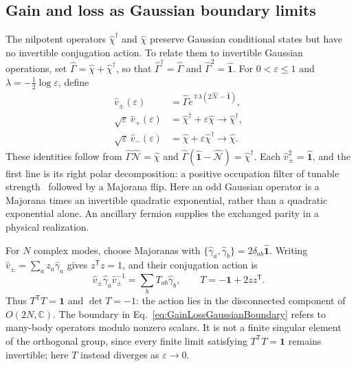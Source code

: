 \documentclass[aps,prb,10pt,twocolumn,superscriptaddress,longbibliography,floatfix]{revtex4-2}
\newcommand{\mc}[1]{\mathcal{#1}}
\begin{document}
{\color{blue}
\subsection{Gain and loss as Gaussian boundary limits}
\label{app:GaussianBoundary}

The nilpotent operators $\hat\chi^\dagger$ and $\hat\chi$ preserve Gaussian conditional states but have no invertible conjugation action. To relate them to invertible Gaussian operations, set $\hat\Gamma=\hat\chi+\hat\chi^\dagger$, so that $\hat\Gamma^\dagger=\hat\Gamma$ and $\hat\Gamma^2=\hat{\mathbf{1}}$. For $0<\varepsilon\leq1$ and $\lambda=-\tfrac12\log\varepsilon$, define
\begin{align}
 \hat v_\pm(\varepsilon)
 &=\hat\Gamma e^{\mp\lambda(2\hat{\mc N}-\hat{\mathbf{1}})},\nonumber\\
 \sqrt\varepsilon\,\hat v_+(\varepsilon)
 &=\hat\chi^\dagger+\varepsilon\hat\chi\longrightarrow\hat\chi^\dagger,\nonumber\\
 \sqrt\varepsilon\,\hat v_-(\varepsilon)
 &=\hat\chi+\varepsilon\hat\chi^\dagger\longrightarrow\hat\chi.
 \label{eq:GainLossGaussianBoundary}
\end{align}
These identities follow from $\hat\Gamma\hat{\mc N}=\hat\chi$ and $\hat\Gamma(\hat{\mathbf{1}}-\hat{\mc N})=\hat\chi^\dagger$. Each $\hat v_\pm^2=\hat{\mathbf{1}}$, and the first line is its right polar decomposition: a positive occupation filter of tunable strength~\cite{BhuiyanPanJian2026} followed by a Majorana flip. Here an odd Gaussian operator is a Majorana times an invertible quadratic exponential, rather than a quadratic exponential alone. An ancillary fermion supplies the exchanged parity in a physical realization.

For $N$ complex modes, choose Majoranas with $\{\hat\gamma_a,\hat\gamma_b\}=2\delta_{ab}\hat{\mathbf{1}}$. Writing $\hat v_\pm=\sum_a z_a\hat\gamma_a$ gives $z^{\mathsf T}z=1$, and their conjugation action is
\begin{equation}
 \hat v_\pm\hat\gamma_a\hat v_\pm^{-1}
 =\sum_b T_{ab}\hat\gamma_b,\qquad
 T=-\mathbf{1}+2zz^{\mathsf T}.
 \label{eq:GainLossOrthogonalAction}
\end{equation}
Thus $T^{\mathsf T}T=\mathbf{1}$ and $\det T=-1$: the action lies in the disconnected component of $O(2N,\mathbb C)$. The boundary in Eq.~\eqref{eq:GainLossGaussianBoundary} refers to many-body operators modulo nonzero scalars. It is not a finite singular element of the orthogonal group, since every finite limit satisfying $T^{\mathsf T}T=\mathbf{1}$ remains invertible; here $T$ instead diverges as $\varepsilon\to0$.

}
\end{document}

